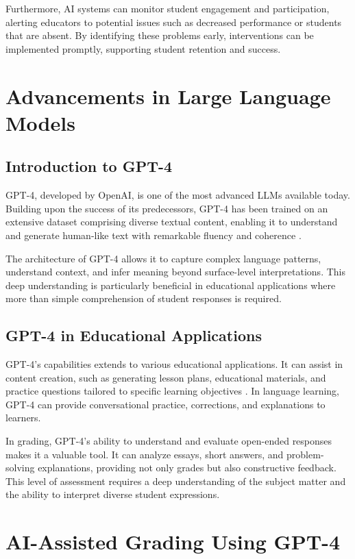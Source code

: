 \documentclass[ms,twoside,print]{nuthesis}
\begin{document}
Furthermore, AI systems can monitor student engagement and participation, alerting educators to potential issues such as decreased performance or students that are absent. By identifying these problems early, interventions can be implemented promptly, supporting student retention and success.

\section{Advancements in Large Language Models}

\subsection{Introduction to GPT-4}

GPT-4, developed by OpenAI, is one of the most advanced LLMs available today. Building upon the success of its predecessors, GPT-4 has been trained on an extensive dataset comprising diverse textual content, enabling it to understand and generate human-like text with remarkable fluency and coherence \cite{Alto2023}.

The architecture of GPT-4 allows it to capture complex language patterns, understand context, and infer meaning beyond surface-level interpretations. This deep understanding is particularly beneficial in educational applications where more than simple comprehension of student responses is required.

\subsection{GPT-4 in Educational Applications}

GPT-4's capabilities extends to various educational applications. It can assist in content creation, such as generating lesson plans, educational materials, and practice questions tailored to specific learning objectives \cite{Alto2023}. In language learning, GPT-4 can provide conversational practice, corrections, and explanations to learners.

In grading, GPT-4's ability to understand and evaluate open-ended responses makes it a valuable tool. It can analyze essays, short answers, and problem-solving explanations, providing not only grades but also constructive feedback. This level of assessment requires a deep understanding of the subject matter and the ability to interpret diverse student expressions.

\section{AI-Assisted Grading Using GPT-4}
\end{document}
